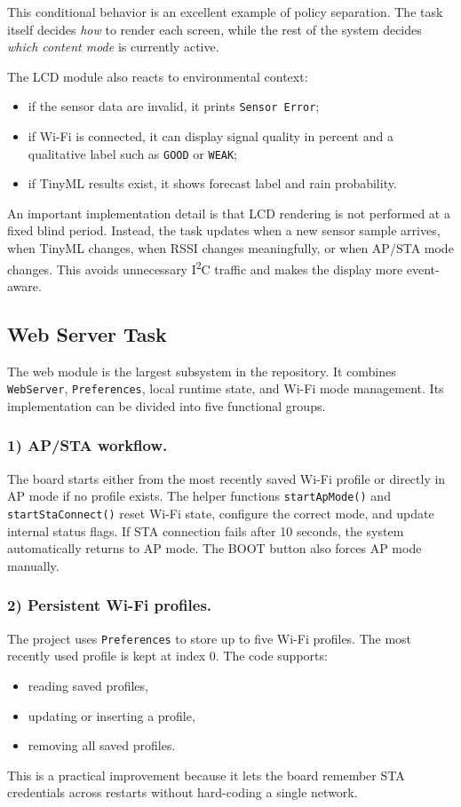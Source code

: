This conditional behavior is an excellent example of policy separation. The
task itself decides \textit{how} to render each screen, while the rest of the
system decides \textit{which content mode} is currently active.

The LCD module also reacts to environmental context:
\begin{itemize}
  \item if the sensor data are invalid, it prints \texttt{Sensor Error};
  \item if Wi-Fi is connected, it can display signal quality in percent and a
  qualitative label such as \texttt{GOOD} or \texttt{WEAK};
  \item if TinyML results exist, it shows forecast label and rain probability.
\end{itemize}

An important implementation detail is that LCD rendering is not performed at a
fixed blind period. Instead, the task updates when a new sensor sample arrives,
when TinyML changes, when RSSI changes meaningfully, or when AP/STA mode
changes. This avoids unnecessary I\textsuperscript{2}C traffic and makes the
display more event-aware.

\subsection{Web Server Task}
The web module is the largest subsystem in the repository. It combines
\texttt{WebServer}, \texttt{Preferences}, local runtime state, and Wi-Fi mode
management. Its implementation can be divided into five functional groups.

\subsubsection*{1) AP/STA workflow.}
The board starts either from the most recently saved Wi-Fi profile or directly
in AP mode if no profile exists. The helper functions
\texttt{startApMode()} and \texttt{startStaConnect()} reset Wi-Fi state,
configure the correct mode, and update internal status flags. If STA connection
fails after 10 seconds, the system automatically returns to AP mode. The BOOT
button also forces AP mode manually.

\subsubsection*{2) Persistent Wi-Fi profiles.}
The project uses \texttt{Preferences} to store up to five Wi-Fi profiles. The
most recently used profile is kept at index 0. The code supports:
\begin{itemize}
  \item reading saved profiles,
  \item updating or inserting a profile,
  \item removing all saved profiles.
\end{itemize}
This is a practical improvement because it lets the board remember STA
credentials across restarts without hard-coding a single network.

